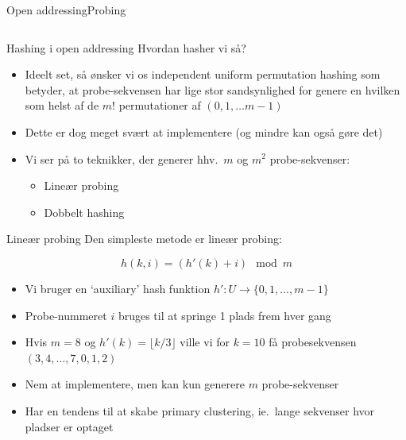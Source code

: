 \documentclass[aspectratio=1610]{beamer}
\begin{document}
\begin{frame}{Open addressing}{Probing}
\begin{columns}
    \end{columns}
\end{frame}


\begin{frame}{Hashing i open addressing}{}
    Hvordan hasher vi så?

    \begin{itemize}
        \item Ideelt set, så ønsker vi os \alert{independent uniform permutation
            hashing} som betyder, at probe-sekvensen har lige stor sandsynlighed
            for genere en hvilken som helst af de $m!$ permutationer af
            $(0,1,\ldots m-1)$
        \item Dette er dog meget svært at implementere (og mindre kan også gøre
            det)
        \item Vi ser på to teknikker, der generer hhv.\ $m$ og $m^2$
            probe-sekvenser:
            \begin{itemize}
                \item Lineær probing
                \item Dobbelt hashing
            \end{itemize}
    \end{itemize}
    
\end{frame}


\begin{frame}{Lineær probing}{}
    Den simpleste metode er \alert{lineær probing}:

    \[
        h(k,i) = (h'(k) + i) \mod m
    \] 

    \begin{itemize}
        \item Vi bruger en `auxiliary' hash funktion $h': U \rightarrow
            \{0,1,\ldots, m-1\}$
        \item Probe-nummeret $i$ bruges til at springe 1 plads frem hver gang
        \item Hvis $m=8$ og $h'(k) = \lfloor k/3 \rfloor$ ville vi for $k=10$ få
            probesekvensen $(3, 4, \ldots, 7, 0, 1, 2)$
        \item Nem at implementere, men kan kun generere $m$ probe-sekvenser
        \item Har en tendens til at skabe \alert{primary clustering}, ie.\ lange
            sekvenser hvor pladser er optaget
    \end{itemize}
\end{frame}
\end{document}
